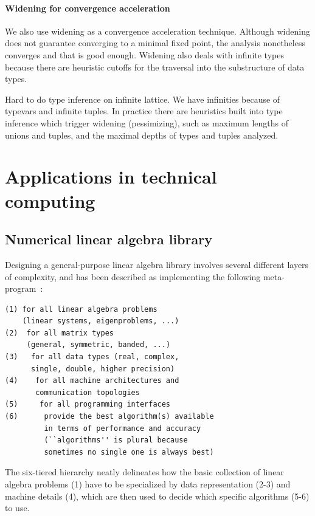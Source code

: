 \documentclass[pldi]{sigplanconf-pldi15}
\begin{document}
\paragraph{Widening for convergence acceleration}
We also use widening as a convergence acceleration technique. Although widening
does not guarantee converging to a minimal fixed point, the analysis
nonetheless converges and that is good enough.  Widening also deals with
infinite types because there are heuristic cutoffs for the traversal into the
substructure of data types.

Hard to do type inference on infinite lattice. We have infinities because of
typevars and infinite tuples.  In practice there are heuristics built into type
inference which trigger widening (pessimizing), such as maximum lengths of
unions and tuples, and the maximal depths of types and tuples analyzed.

\section{Applications in technical computing}


\subsection{Numerical linear algebra library}

Designing a general-purpose linear algebra library involves several different
layers of complexity, and has been described as implementing the following
meta-program~\cite{Demmel2007}:

{\small
\begin{verbatim}
(1) for all linear algebra problems
    (linear systems, eigenproblems, ...)
(2)  for all matrix types
     (general, symmetric, banded, ...)
(3)   for all data types (real, complex,
      single, double, higher precision)
(4)    for all machine architectures and
       communication topologies
(5)     for all programming interfaces
(6)      provide the best algorithm(s) available
         in terms of performance and accuracy
         (``algorithms'' is plural because
         sometimes no single one is always best)
\end{verbatim}
}
%
The six-tiered hierarchy neatly delineates how the basic collection of linear
algebra problems (1) have to be specialized by data representation (2-3) and
machine details (4), which are then used to decide which specific algorithms
(5-6) to use.
\end{document}
